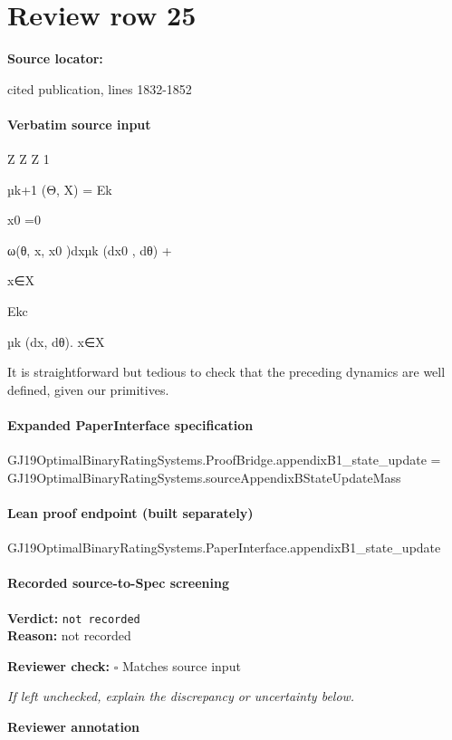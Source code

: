 \documentclass[10pt]{article}
\newcommand{\reviewerbox}{%
  \par\noindent\fbox{\parbox{0.96\linewidth}{\rule{0pt}{0.38in}}}\par
}
\newcommand{\reviewmatch}[1]{%
  \par\noindent\textbf{Reviewer check:} $\square$\; #1\par
  \noindent\emph{If left unchecked, explain the discrepancy or uncertainty below.}\par
}
\begin{document}
\section*{Review row 25}
\textbf{Source locator:} {\footnotesize\raggedright cited publication, lines 1832-\allowbreak{}1852\par}
\paragraph{Verbatim source input}
\begin{ReviewVerbatim}
Z
Z Z
1

µk+1 (Θ, X) =
Ek

x0 =0

ω(θ, x, x0 )dxµk (dx0 , dθ) +

x∈X

Ekc

µk (dx, dθ).
x∈X

It is straightforward but tedious to check that the preceding dynamics are well defined, given our
primitives.
\end{ReviewVerbatim}


\paragraph{Expanded PaperInterface specification}
\begin{ReviewVerbatim}
GJ19OptimalBinaryRatingSystems.ProofBridge.appendixB1_state_update =
  GJ19OptimalBinaryRatingSystems.sourceAppendixBStateUpdateMass
\end{ReviewVerbatim}

\paragraph{Lean proof endpoint (built separately)}\begin{ReviewVerbatim}
GJ19OptimalBinaryRatingSystems.PaperInterface.appendixB1_state_update
\end{ReviewVerbatim}

\paragraph{Recorded source-to-Spec screening}
\textbf{Verdict:} \texttt{not recorded}
\\
\textbf{Reason:} not recorded
\reviewmatch{Matches source input}
\noindent\textbf{Reviewer annotation}\par
\reviewerbox
\clearpage
\hypertarget{source-claim-52ebae870dd67c82}{}
\end{document}
